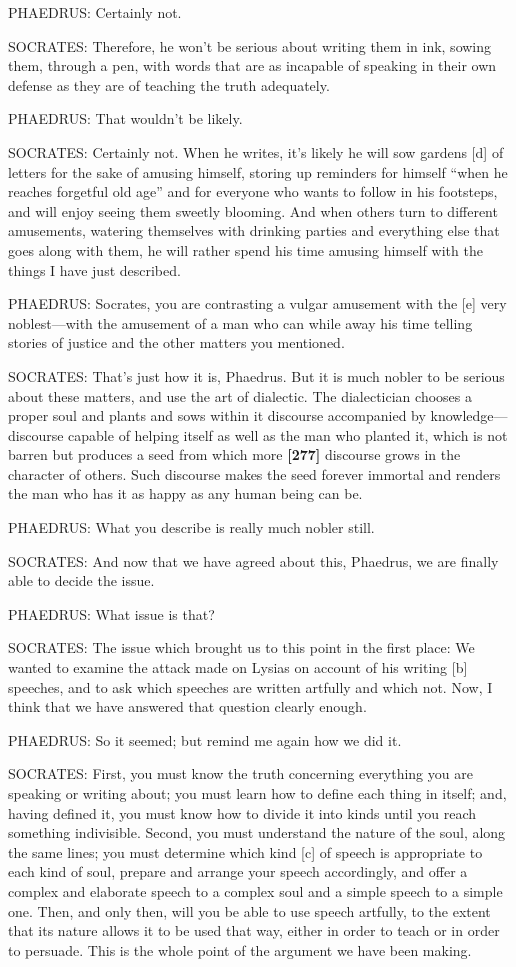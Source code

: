 PHAEDRUS: Certainly not.

SOCRATES: Therefore, he won't be serious about writing them in ink,
sowing them, through a pen, with words that are as incapable of speaking
in their own defense as they are of teaching the truth adequately.

PHAEDRUS: That wouldn't be likely.

SOCRATES: Certainly not. When he writes, it's likely he will sow gardens
{[}d{]} of letters for the sake of amusing himself, storing up reminders
for himself “when he reaches forgetful old age” and for everyone who
wants to follow in his footsteps, and will enjoy seeing them sweetly
blooming. And when others turn to different amusements, watering
themselves with drinking parties and everything else that goes along
with them, he will rather spend his time amusing himself with the things
I have just described.

PHAEDRUS: Socrates, you are contrasting a vulgar amusement with the
{[}e{]} very noblest---with the amusement of a man who can while away
his time telling stories of justice and the other matters you mentioned.

SOCRATES: That's just how it is, Phaedrus. But it is much nobler to be
serious about these matters, and use the art of dialectic. The
dialectician chooses a proper soul and plants and sows within it
discourse accompanied by knowledge---discourse capable of helping itself
as well as the man who planted it, which is not barren but produces a
seed from which more {\bf {[}277{]}} discourse grows in the character of
others. Such discourse makes the seed forever immortal and renders the
man who has it as happy as any human being can be.

PHAEDRUS: What you describe is really much nobler still.

SOCRATES: And now that we have agreed about this, Phaedrus, we are
finally able to decide the issue.

PHAEDRUS: What issue is that?

SOCRATES: The issue which brought us to this point in the first place:
We wanted to examine the attack made on Lysias on account of his writing
{[}b{]} speeches, and to ask which speeches are written artfully and
which not. Now, I think that we have answered that question clearly
enough.

PHAEDRUS: So it seemed; but remind me again how we did it.

SOCRATES: First, you must know the truth concerning everything you are
speaking or writing about; you must learn how to define each thing in
itself; and, having defined it, you must know how to divide it into
kinds until you reach something indivisible. Second, you must understand
the nature of the soul, along the same lines; you must determine which
kind {[}c{]} of speech is appropriate to each kind of soul, prepare and
arrange your speech accordingly, and offer a complex and elaborate
speech to a complex soul and a simple speech to a simple one. Then, and
only then, will you be able to use speech artfully, to the extent that
its nature allows it to be used that way, either in order to teach or in
order to persuade. This is the whole point of the argument we have been
making.

